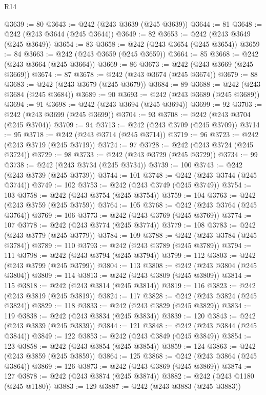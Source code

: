 \begin{lexlean}{R14}
\begin{coremodule}
{{{{{{{{{{{{{{{{{{{{{{{{{{{{{{{{{{{{{{{{{{{{{{{{{{{{{{{{{{{{{{{{{{{{{{{{{{{{{{{{{{@3639 := 80
@3643 := @242 (@243 @3639 (@245 @3639))
@3644 := 81
@3648 := @242 (@243 @3644 (@245 @3644))
@3649 := 82
@3653 := @242 (@243 @3649 (@245 @3649))
@3654 := 83
@3658 := @242 (@243 @3654 (@245 @3654))
@3659 := 84
@3663 := @242 (@243 @3659 (@245 @3659))
@3664 := 85
@3668 := @242 (@243 @3664 (@245 @3664))
@3669 := 86
@3673 := @242 (@243 @3669 (@245 @3669))
@3674 := 87
@3678 := @242 (@243 @3674 (@245 @3674))
@3679 := 88
@3683 := @242 (@243 @3679 (@245 @3679))
@3684 := 89
@3688 := @242 (@243 @3684 (@245 @3684))
@3689 := 90
@3693 := @242 (@243 @3689 (@245 @3689))
@3694 := 91
@3698 := @242 (@243 @3694 (@245 @3694))
@3699 := 92
@3703 := @242 (@243 @3699 (@245 @3699))
@3704 := 93
@3708 := @242 (@243 @3704 (@245 @3704))
@3709 := 94
@3713 := @242 (@243 @3709 (@245 @3709))
@3714 := 95
@3718 := @242 (@243 @3714 (@245 @3714))
@3719 := 96
@3723 := @242 (@243 @3719 (@245 @3719))
@3724 := 97
@3728 := @242 (@243 @3724 (@245 @3724))
@3729 := 98
@3733 := @242 (@243 @3729 (@245 @3729))
@3734 := 99
@3738 := @242 (@243 @3734 (@245 @3734))
@3739 := 100
@3743 := @242 (@243 @3739 (@245 @3739))
@3744 := 101
@3748 := @242 (@243 @3744 (@245 @3744))
@3749 := 102
@3753 := @242 (@243 @3749 (@245 @3749))
@3754 := 103
@3758 := @242 (@243 @3754 (@245 @3754))
@3759 := 104
@3763 := @242 (@243 @3759 (@245 @3759))
@3764 := 105
@3768 := @242 (@243 @3764 (@245 @3764))
@3769 := 106
@3773 := @242 (@243 @3769 (@245 @3769))
@3774 := 107
@3778 := @242 (@243 @3774 (@245 @3774))
@3779 := 108
@3783 := @242 (@243 @3779 (@245 @3779))
@3784 := 109
@3788 := @242 (@243 @3784 (@245 @3784))
@3789 := 110
@3793 := @242 (@243 @3789 (@245 @3789))
@3794 := 111
@3798 := @242 (@243 @3794 (@245 @3794))
@3799 := 112
@3803 := @242 (@243 @3799 (@245 @3799))
@3804 := 113
@3808 := @242 (@243 @3804 (@245 @3804))
@3809 := 114
@3813 := @242 (@243 @3809 (@245 @3809))
@3814 := 115
@3818 := @242 (@243 @3814 (@245 @3814))
@3819 := 116
@3823 := @242 (@243 @3819 (@245 @3819))
@3824 := 117
@3828 := @242 (@243 @3824 (@245 @3824))
@3829 := 118
@3833 := @242 (@243 @3829 (@245 @3829))
@3834 := 119
@3838 := @242 (@243 @3834 (@245 @3834))
@3839 := 120
@3843 := @242 (@243 @3839 (@245 @3839))
@3844 := 121
@3848 := @242 (@243 @3844 (@245 @3844))
@3849 := 122
@3853 := @242 (@243 @3849 (@245 @3849))
@3854 := 123
@3858 := @242 (@243 @3854 (@245 @3854))
@3859 := 124
@3863 := @242 (@243 @3859 (@245 @3859))
@3864 := 125
@3868 := @242 (@243 @3864 (@245 @3864))
@3869 := 126
@3873 := @242 (@243 @3869 (@245 @3869))
@3874 := 127
@3878 := @242 (@243 @3874 (@245 @3874))
@3882 := @242 (@243 @1180 (@245 @1180))
@3883 := 129
@3887 := @242 (@243 @3883 (@245 @3883))
}}}}}}}}}}}}}}}}}}}}}}}}}}}}}}}}}}}}}}}}}}}}}}}}}}}}}}}}}}}}}}}}}}}}}}}}}}}}}}}}}}
\end{coremodule}
\end{lexlean}
